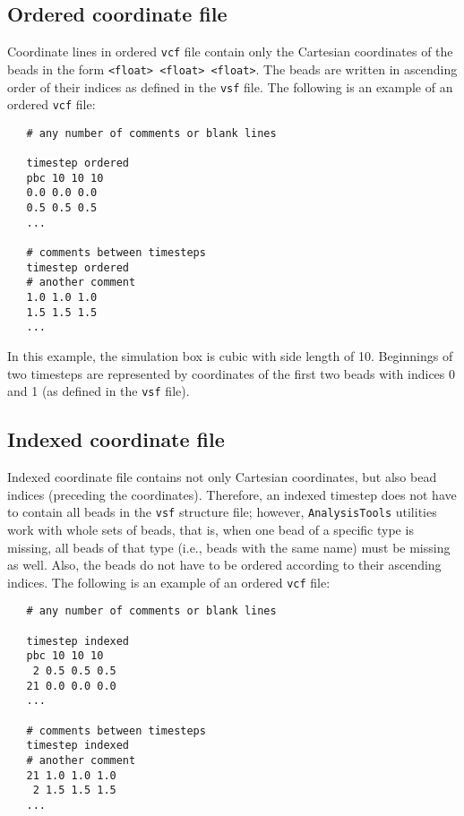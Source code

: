 \subsection{Ordered coordinate file} \label{ssec:OrderedVcf}

Coordinate lines in ordered \texttt{vcf} file contain only the Cartesian
coordinates of the beads in the form \texttt{<float> <float> <float>}. The
beads are written in ascending order of their indices as defined in the
\texttt{vsf} file. The following is an example of an ordered \texttt{vcf}
file:

\begin{verbatim}
   # any number of comments or blank lines

   timestep ordered
   pbc 10 10 10
   0.0 0.0 0.0
   0.5 0.5 0.5
   ...

   # comments between timesteps
   timestep ordered
   # another comment
   1.0 1.0 1.0
   1.5 1.5 1.5
   ...
\end{verbatim}

In this example, the simulation box is cubic with side length of 10.
Beginnings of two timesteps are represented by coordinates of the first two
beads with indices 0 and 1 (as defined in the \texttt{vsf} file).

\subsection{Indexed coordinate file} \label{ssec:IndexedVcf}

Indexed coordinate file contains not only Cartesian coordinates, but also
bead indices (preceding the coordinates). Therefore, an indexed timestep
does not have to contain all beads in the \texttt{vsf} structure file;
however, \texttt{AnalysisTools} utilities work with whole sets of beads,
that is, when one bead of a specific type is missing, all beads of that
type (i.e., beads with the same name) must be missing as well. Also, the
beads do not have to be ordered according to their ascending indices.  The
following is an example of an ordered \texttt{vcf} file:

\begin{verbatim}
   # any number of comments or blank lines

   timestep indexed
   pbc 10 10 10
    2 0.5 0.5 0.5
   21 0.0 0.0 0.0
   ...

   # comments between timesteps
   timestep indexed
   # another comment
   21 1.0 1.0 1.0
    2 1.5 1.5 1.5
   ...
\end{verbatim}

